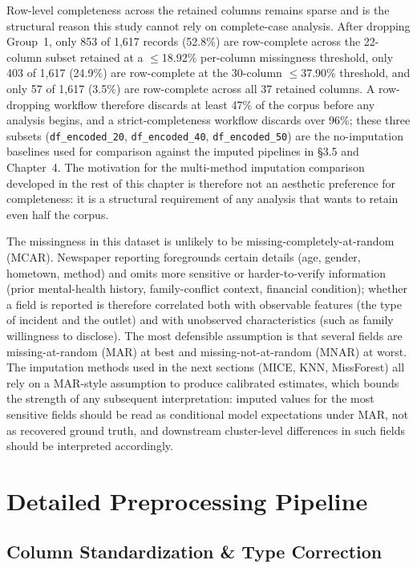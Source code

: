 Row-level completeness across the retained columns remains sparse and is the structural reason this study cannot rely on complete-case analysis. After dropping Group~1, only 853 of 1{,}617 records (52.8\%) are row-complete across the 22-column subset retained at a $\leq$18.92\% per-column missingness threshold, only 403 of 1{,}617 (24.9\%) are row-complete at the 30-column $\leq$37.90\% threshold, and only 57 of 1{,}617 (3.5\%) are row-complete across all 37 retained columns. A row-dropping workflow therefore discards at least 47\% of the corpus before any analysis begins, and a strict-completeness workflow discards over 96\%; these three subsets (\texttt{df\_encoded\_20}, \texttt{df\_encoded\_40}, \texttt{df\_encoded\_50}) are the no-imputation baselines used for comparison against the imputed pipelines in \S3.5 and Chapter~4. The motivation for the multi-method imputation comparison developed in the rest of this chapter is therefore not an aesthetic preference for completeness: it is a structural requirement of any analysis that wants to retain even half the corpus.

The missingness in this dataset is unlikely to be missing-completely-at-random (MCAR). Newspaper reporting foregrounds certain details (age, gender, hometown, method) and omits more sensitive or harder-to-verify information (prior mental-health history, family-conflict context, financial condition); whether a field is reported is therefore correlated both with observable features (the type of incident and the outlet) and with unobserved characteristics (such as family willingness to disclose). The most defensible assumption is that several fields are missing-at-random (MAR) at best and missing-not-at-random (MNAR) at worst. The imputation methods used in the next sections (MICE, KNN, MissForest) all rely on a MAR-style assumption to produce calibrated estimates, which bounds the strength of any subsequent interpretation: imputed values for the most sensitive fields should be read as conditional model expectations under MAR, not as recovered ground truth, and downstream cluster-level differences in such fields should be interpreted accordingly.

\section{Detailed Preprocessing Pipeline}

\subsection{Column Standardization \& Type Correction}

